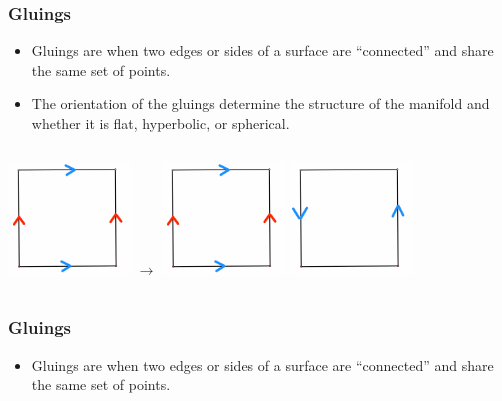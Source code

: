 \documentclass[13pt]{beamer}
\begin{document}
\begin{frame}
\frametitle{Gluings}
	\begin{itemize}
    \item \alert{Gluings} are when two edges or sides of a surface are ``connected'' and share the same set of points.
		\item The orientation of the gluings determine the structure of the manifold and whether it is flat, hyperbolic, or spherical.
	\end{itemize}

  \begin{columns}[r] %
     \centering
      \includegraphics[height=3cm]{./img/torusgluing} $\rightarrow$
     \centering
     \includegraphics[height=3cm]{./img/torusgluing}
     \centering
      \includegraphics[height=3cm]{./img/mobiusgluing}
  \end{columns}
\end{frame}

\begin{frame}
\frametitle{Gluings}
	\begin{itemize}
		\item \alert{Gluings} are when two edges or sides of a surface are ``connected'' and share the same set of points.
	\end{itemize}
\end{frame}
\end{document}
